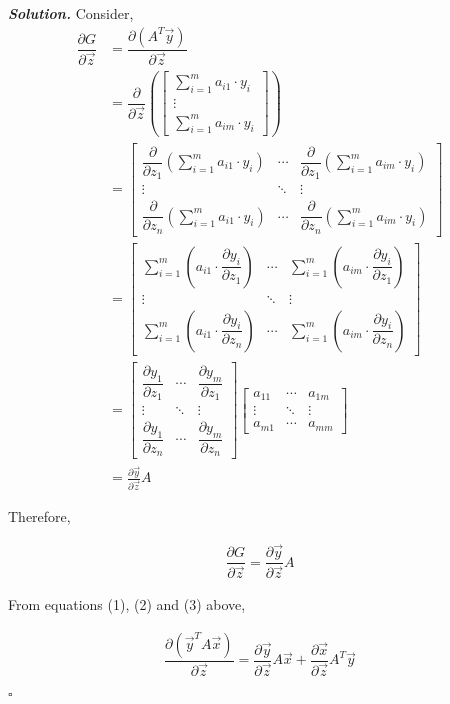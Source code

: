 \documentclass[11pt]{amsart}
\newenvironment{solution}[1][\it{Solution}]{\textbf{#1. } }{$\square$}
\theoremstyle{definition}
\newcommand{\vx}{\vec{x}}
\newcommand{\vy}{\vec{y}}
\newcommand{\vz}{\vec{z}}
\begin{document}
\begin{solution}
Consider,
\begin{align*}
\dfrac{\partial G}{\partial \vz} &= \dfrac{\partial (A^T\vy)}{\partial \vz}\\
&= \dfrac{\partial}{\partial \vz} \left( \begin{bmatrix}\sum_{i=1}^{m}a_{i1} \cdot y_i\\\vdots\\\sum_{i=1}^{m}a_{im} \cdot y_i\end{bmatrix} \right)\\
&= \left[\begin{array}{ccc}\dfrac{\partial}{\partial z_1} \left( \sum_{i=1}^{m}a_{i1} \cdot y_i \right) & \cdots & \dfrac{\partial}{\partial z_1} \left( \sum_{i=1}^{m}a_{im} \cdot y_i \right) \\ \vdots & \ddots & \vdots \\ \dfrac{\partial}{\partial z_n} \left( \sum_{i=1}^{m}a_{i1} \cdot y_i \right) & \cdots & \dfrac{\partial}{\partial z_n} \left( \sum_{i=1}^{m}a_{im} \cdot y_i \right)\end{array}\right]\\
&= \left[\begin{array}{ccc} \sum_{i=1}^{m}\left(a_{i1} \cdot \dfrac{\partial y_i}{\partial z_1} \right) & \cdots & \sum_{i=1}^{m} \left( a_{im}  \cdot \dfrac{\partial y_i}{\partial z_1} \right) \\ \vdots & \ddots & \vdots \\ \sum_{i=1}^{m}\left(a_{i1} \cdot \dfrac{\partial y_i}{\partial z_n} \right) & \cdots & \sum_{i=1}^{m}\left(a_{im} \cdot \dfrac{\partial y_i}{\partial z_n} \right)\end{array}\right]\\
&= \left[\begin{array}{ccc}\dfrac{\partial y_1}{\partial z_1} & \cdots & \dfrac{\partial y_m}{\partial z_1} \\ \vdots & \ddots & \vdots \\ \dfrac{\partial y_1}{\partial z_n} & \cdots & \dfrac{\partial y_m}{\partial z_n}\end{array}\right] \left[\begin{array}{ccc}a_{11} & \cdots & a_{1m} \\ \vdots & \ddots & \vdots \\ a_{m1} & \cdots & a_{mm}\end{array}\right]\\
&= \frac{\partial \vy}{\partial \vz}A
\end{align*}

Therefore,

\begin{align}
\dfrac{\partial G}{\partial \vz} = \dfrac{\partial \vy}{\partial \vz} A
\end{align}

From equations (1), (2) and (3) above,

\begin{align*}
\boxed{\dfrac{\partial (\vy^TA\vx)}{\partial \vz} = \dfrac{\partial \vy}{\partial \vz} A \vx + \dfrac{\partial \vx}{\partial \vz} A^T \vy}
\end{align*}

\end{solution}
\end{document}
